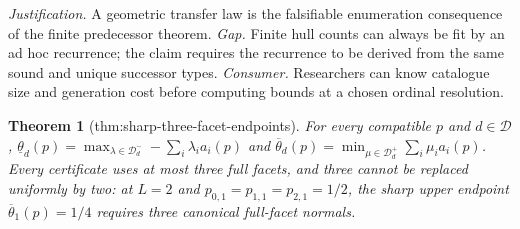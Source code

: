 \documentclass{article}
\newtheorem{theorem}{Theorem}
\begin{document}
\par\smallskip\noindent \textit{Justification.} A geometric transfer law is the falsifiable enumeration consequence of the finite predecessor theorem. \textit{Gap.} Finite hull counts can always be fit by an ad hoc recurrence; the claim requires the recurrence to be derived from the same sound and unique successor types. \textit{Consumer.} Researchers can know catalogue size and generation cost before computing bounds at a chosen ordinal resolution.

\begin{theorem}[thm:sharp-three-facet-endpoints]\label{thm:sharp-three-facet-endpoints}
For every compatible \(p\) and \(d\in\mathcal D\), \(\underline\theta_d(p)=\max_{\lambda\in\mathcal D_d^-}-\sum_i\lambda_i a_i(p)\) and \(\overline\theta_d(p)=\min_{\mu\in\mathcal D_d^+}\sum_i\mu_i a_i(p)\). Every certificate uses at most three full facets, and three cannot be replaced uniformly by two: at \(L=2\) and \(p_{0,1}=p_{1,1}=p_{2,1}=1/2\), the sharp upper endpoint \(\overline\theta_1(p)=1/4\) requires three canonical full-facet normals.
\end{theorem}
\end{document}
